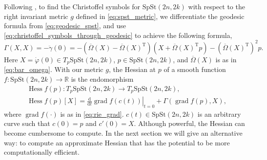 Following \cite[p.~10]{JensenZimmermann2024}, to find the Christoffel symbols for $\mathrm{SpSt}(2n, 2k)$ with respect to the right invariant metric $g$ defined in \eqref{eq:spst_metric}, we differentiate the geodesic formula from \ref{eq:geodesic_spst}, and use \eqref{eq:christoffel_symbols_through_geodesic} to achieve the following formula,
\begin{equation*}
    \Gamma(X,X)=-\ddot{\gamma}(0)=-(\overline{\Omega}(X)-\overline{\Omega}(X)^{\mathrm{T}})(X+\overline{\Omega}(X)^{\mathrm{T}}p)-(\overline{\Omega}(X)^{\mathrm{T}})^{2}p.
\end{equation*}
Here $X=\dot{\varphi}(0)\in T_{p}\mathrm{SpSt}(2n, 2k)$, $p\in \mathrm{SpSt}(2n, 2k)$, and $\overline{\Omega}(X)$ is as in \ref{eq:bar_omega}. 
With our metric $g$, the Hessian at $p$ of a smooth function $f\colon \mathrm{SpSt}(2n, 2k)\xrightarrow{}\mathbb{R}$ is the endomorphism 
\begin{equation}\label{eq:riemannian_hessian}
    \begin{gathered}
        \operatorname{Hess}f(p)\colon T_{p}\mathrm{SpSt}(2n, 2k)\xrightarrow{}T_{p}\mathrm{SpSt}(2n, 2k),  \\
        \operatorname{Hess}f(p)[X]=\left.\frac{\mathrm{d}}{\mathrm{d}t}\operatorname{grad}f(c(t))\right|_{t=0}+\Gamma(\operatorname{grad}f(p),X),
    \end{gathered}
\end{equation}
where $\operatorname{grad}f(\cdot)$ is as in \ref{eq:rie_grad}. $c(t)\in \mathrm{SpSt}(2n, 2k)$ is an arbitrary curve such that $c(0)=p$ and $c'(0)=X$. 
Although powerful, the Hessian can become cumbersome to compute. In the next section we will give an alternative way: to compute an approximate Hessian that has the potential to be more computationally efficient. 